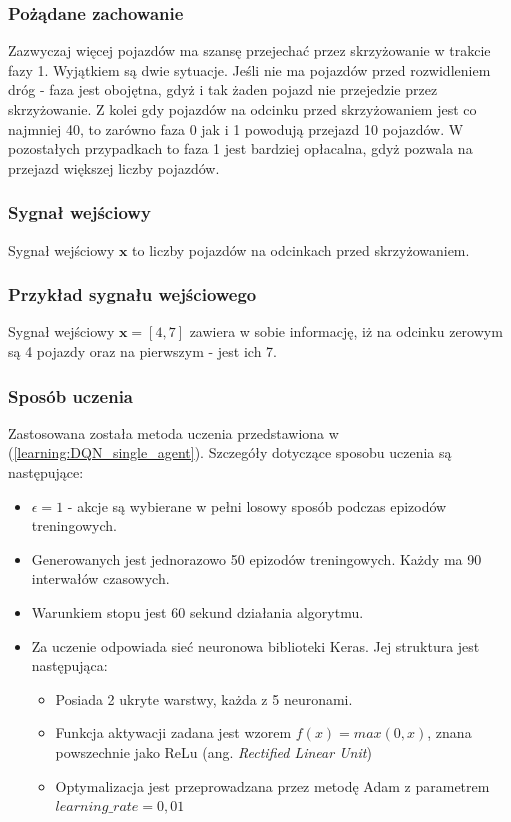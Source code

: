\documentclass[12pt]{book}
\theoremstyle{plain}
\newcommand{\myref}[1]{(\ref{#1})}
\begin{document}
\subsubsection*{Pożądane zachowanie}
Zazwyczaj więcej pojazdów ma szansę przejechać przez skrzyżowanie w trakcie fazy 1. Wyjątkiem są dwie sytuacje. Jeśli nie ma pojazdów przed rozwidleniem dróg - faza jest obojętna, gdyż i tak żaden pojazd nie przejedzie przez skrzyżowanie. Z kolei gdy pojazdów na odcinku przed skrzyżowaniem jest co najmniej 40, to zarówno faza 0 jak i 1 powodują przejazd 10 pojazdów. W pozostałych przypadkach to faza 1 jest bardziej opłacalna, gdyż pozwala na przejazd większej liczby pojazdów.
\subsubsection*{Sygnał wejściowy}
Sygnał wejściowy $\textbf{x}$ to liczby pojazdów na odcinkach przed skrzyżowaniem.
\subsubsection*{Przykład sygnału wejściowego}
Sygnał wejściowy $ \textbf{x}=[4,7] $ zawiera w sobie informację, iż na odcinku zerowym są 4 pojazdy oraz na pierwszym - jest ich 7. 
\subsubsection*{Sposób uczenia}
Zastosowana została metoda uczenia przedstawiona w \myref{learning:DQN_single_agent}. Szczegóły dotyczące sposobu uczenia są następujące:
\begin{itemize}
	\item $\epsilon = 1$ - akcje są wybierane w pełni losowy sposób podczas epizodów treningowych.
	\item Generowanych jest jednorazowo 50 epizodów treningowych. Każdy ma 90 interwałów czasowych.
	\item Warunkiem stopu jest 60 sekund działania algorytmu.
	\item Za uczenie odpowiada sieć neuronowa biblioteki Keras. Jej struktura jest następująca:  
	\begin{itemize}
		\item Posiada 2 ukryte warstwy, każda z 5 neuronami.
		\item Funkcja aktywacji zadana jest wzorem $f(x)=max({0,x})$, znana powszechnie jako ReLu (ang. \emph{Rectified Linear Unit})
		\item Optymalizacja jest przeprowadzana przez metodę Adam \cite{adam} z parametrem $learning\_rate = 0,01$
	\end{itemize}
\end{itemize}
\end{document}
